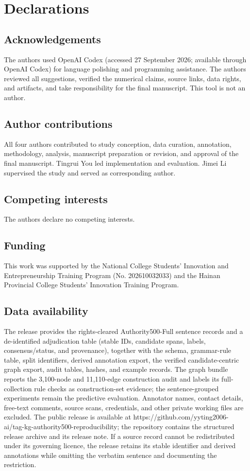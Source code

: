 \documentclass{CUP-JNL-NLP}
\begin{document}
\section{Declarations}
\subsection{Acknowledgements}
The authors used OpenAI Codex (accessed 27 September 2026; available through OpenAI Codex) for language polishing and programming assistance. The authors reviewed all suggestions, verified the numerical claims, source links, data rights, and artifacts, and take responsibility for the final manuscript. This tool is not an author.

\subsection{Author contributions}
All four authors contributed to study conception, data curation, annotation, methodology, analysis, manuscript preparation or revision, and approval of the final manuscript. Tingrui You led implementation and evaluation. Jimei Li supervised the study and served as corresponding author.

\subsection{Competing interests}
The authors declare no competing interests.

\subsection{Funding}
This work was supported by the National College Students' Innovation and Entrepreneurship Training Program (No. 202610032033) and the Hainan Provincial College Students' Innovation Training Program.

\subsection{Data availability}
The release provides the rights-cleared Authority500-Full sentence records and a de-identified adjudication table (stable IDs, candidate spans, labels, consensus/status, and provenance), together with the schema, grammar-rule table, split identifiers, derived annotation export, the verified candidate-centric graph export, audit tables, hashes, and example records. The graph bundle reports the 3,100-node and 11,110-edge construction audit and labels its full-collection rule checks as construction-set evidence; the sentence-grouped experiments remain the predictive evaluation. Annotator names, contact details, free-text comments, source scans, credentials, and other private working files are excluded. The public release is available at https://github.com/yyting2006-ai/tag-kg-authority500-reproducibility; the repository contains the structured release archive and its release note. If a source record cannot be redistributed under its governing licence, the release retains its stable identifier and derived annotations while omitting the verbatim sentence and documenting the restriction.
\end{document}
